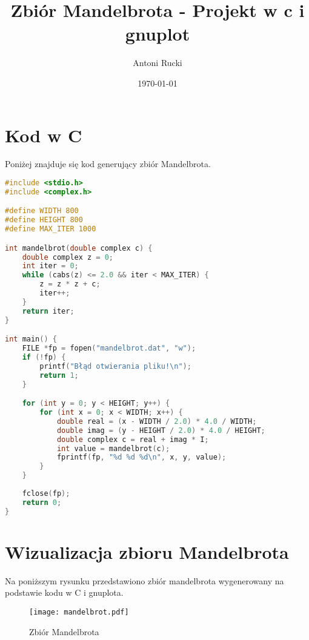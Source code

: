 \documentclass{article}
\title{Zbiór Mandelbrota - Projekt w c i gnuplot}
\author{Antoni Rucki}
\date{\today}
\begin{document}
\maketitle
\tableofcontents
\newpage{}
\section{Kod w C}
Poniżej znajduje się kod generujący zbiór Mandelbrota.



\begin{lstlisting}[language=C, caption=Kod programu Mandelbrota]
#include <stdio.h>
#include <complex.h>

#define WIDTH 800
#define HEIGHT 800
#define MAX_ITER 1000

int mandelbrot(double complex c) {
    double complex z = 0;
    int iter = 0;
    while (cabs(z) <= 2.0 && iter < MAX_ITER) {
        z = z * z + c;
        iter++;
    }
    return iter;
}

int main() {
    FILE *fp = fopen("mandelbrot.dat", "w");
    if (!fp) {
        printf("Błąd otwierania pliku!\n");
        return 1;
    }

    for (int y = 0; y < HEIGHT; y++) {
        for (int x = 0; x < WIDTH; x++) {
            double real = (x - WIDTH / 2.0) * 4.0 / WIDTH;
            double imag = (y - HEIGHT / 2.0) * 4.0 / HEIGHT;
            double complex c = real + imag * I;
            int value = mandelbrot(c);
            fprintf(fp, "%d %d %d\n", x, y, value);
        }
    }
    
    fclose(fp);
    return 0;
}

\end{lstlisting}
\newpage{}
\section{Wizualizacja zbioru Mandelbrota}
Na poniższym rysunku przedstawiono zbiór mandelbrota wygenerowany na podstawie kodu w C i gnuplota.

\begin{figure}[h]
    \centering
    \texttt{[image: mandelbrot.pdf]}
    \caption{Zbiór Mandelbrota}
    \label{fig:mandelbrot}
\end{figure}
\end{document}
